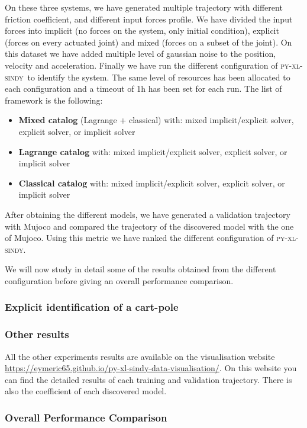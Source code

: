 \documentclass[12pt]{article}
\newcommand{\frameworkname}{\textsc{py-xl-sindy}}
\begin{document}
On these three systems, we have generated multiple trajectory with different friction coefficient, and different input forces profile. We have divided the input forces into implicit (no forces on the system, only initial condition), explicit (forces on every actuated joint) and mixed (forces on a subset of the joint). 
On this dataset we have added multiple level of gaussian noise to the position, velocity and acceleration. Finally we have run the different configuration of \frameworkname\ to identify the system. The same level of resources has been allocated to each configuration and a timeout of 1h has been set for each run.
The list of framework is the following: 
\begin{itemize}
	\item \textbf{Mixed catalog} (Lagrange + classical) with: mixed implicit/explicit solver, explicit solver, or implicit solver
	\item \textbf{Lagrange catalog} with: mixed implicit/explicit solver, explicit solver, or implicit solver
	\item \textbf{Classical catalog} with: mixed implicit/explicit solver, explicit solver, or implicit solver
\end{itemize}

After obtaining the different models, we have generated a validation trajectory with Mujoco and compared the trajectory of the discovered model with the one of Mujoco. Using this metric we have ranked the different configuration of \frameworkname.

We will now study in detail some of the results obtained from the different configuration before giving an overall performance comparison.

\subsubsection*{Explicit identification of a cart-pole}


\subsubsection*{Other results}

All the other experiments results are available on the visualisation website \url{https://eymeric65.github.io/py-xl-sindy-data-visualisation/}. On this website you can find the detailed results of each training and validation trajectory. There is also the coefficient of each discovered model.

\subsubsection*{Overall Performance Comparison}
\end{document}
